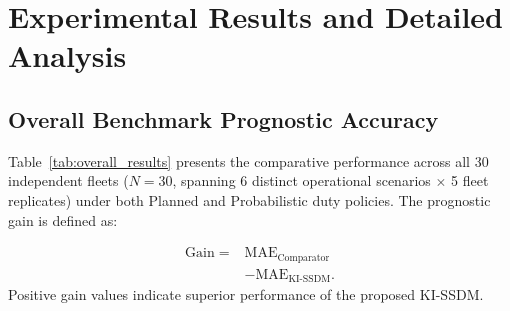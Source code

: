 \documentclass[a4paper,fleqn]{cas-dc}
\newcommand{\MAE}{\mathrm{MAE}}
\begin{document}
\section{Experimental Results and Detailed Analysis}
\label{sec:results}

\subsection{Overall Benchmark Prognostic Accuracy}
\label{subsec:overall_results}

Table~\ref{tab:overall_results} presents the comparative performance across all 30 independent fleets ($N = 30$, spanning 6 distinct operational scenarios $\times$ 5 fleet replicates) under both Planned and Probabilistic duty policies. The prognostic gain is defined as:

\begin{equation}
\begin{aligned}
\mathrm{Gain} ={}&
\MAE_{\mathrm{Comparator}} \\
&- \MAE_{\mathrm{KI\text{-}SSDM}}.
\end{aligned}
\label{eq:gain_def}
\end{equation}
\noindent
Positive gain values indicate superior performance
of the proposed KI-SSDM.


\newlength{\ovColA}
\newlength{\ovColB}
\newlength{\ovColC}
\newlength{\ovColD}
\newlength{\ovColE}
\newlength{\ovColF}
\newlength{\ovColG}
\newlength{\ovColH}
\newlength{\ovColI}

\setlength{\ovColA}{1.85cm} %
\setlength{\ovColB}{2.30cm} %
\setlength{\ovColC}{1.05cm} %
\setlength{\ovColD}{1.25cm} %
\setlength{\ovColE}{2.25cm} %
\setlength{\ovColF}{1.85cm} %
\setlength{\ovColG}{1.85cm} %
\setlength{\ovColH}{1.15cm} %
\setlength{\ovColI}{2.50cm} %
\end{document}
